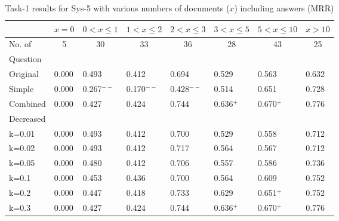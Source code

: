 \begin{table}[t]
  \begin{center}
    \caption{Task-1 results for Sys-5 with various numbers of documents ($x$) including answers (MRR)}
    \begin{tabular}{|l@{ }|l@{ }|l@{ }|l@{ }|l@{ }|l@{ }|l@{ }|l@{ }|} \hline
         &  \multicolumn{1}{c|}{$x=0$}        &  \multicolumn{1}{c|}{$0<x\leq1$}        & \multicolumn{1}{c|}{$1<x\leq2$}        & \multicolumn{1}{c|}{$2<x\leq3$}        & \multicolumn{1}{c|}{$3<x\leq5$}        & \multicolumn{1}{c|}{$5<x\leq10$}        & \multicolumn{1}{c|}{$x>10$}        \\\hline
No. of  & \multicolumn{1}{c|}{5}            & \multicolumn{1}{c|}{30}           & \multicolumn{1}{c|}{33}           & \multicolumn{1}{c|}{36}           & \multicolumn{1}{c|}{28}           & \multicolumn{1}{c|}{43}           & \multicolumn{1}{c|}{25}\\[-0.1cm]
Question  &  & & & & & & \\\hline
Original         & 0.000        & 0.493        & 0.412        & 0.694        & 0.529        & 0.563        & 0.632\\\hline
Simple           & 0.000        & 0.267$^{--}$ & 0.170$^{--}$ & 0.428$^{--}$ & 0.514        & 0.651        & 0.728\\\hline
Combined         & 0.000        & 0.427        & 0.424        & 0.744        & 0.636$^{+}$  & 0.670$^{+}$  & 0.776\\\hline
Decreased        &              &              &              &              &              &              &      \\
k=0.01           & 0.000        & 0.493        & 0.412        & 0.700        & 0.529        & 0.558        & 0.712\\
k=0.02           & 0.000        & 0.493        & 0.412        & 0.717        & 0.564        & 0.567        & 0.712\\
k=0.05           & 0.000        & 0.480        & 0.412        & 0.706        & 0.557        & 0.586        & 0.736\\
k=0.1            & 0.000        & 0.453        & 0.436        & 0.700        & 0.564        & 0.609        & 0.752\\
k=0.2            & 0.000        & 0.447        & 0.418        & 0.733        & 0.629        & 0.651$^{+}$  & 0.752\\
k=0.3            & 0.000        & 0.427        & 0.424        & 0.744        & 0.636$^{+}$  & 0.670$^{+}$  & 0.776\\

\end{tabular}
\end{center}
\end{table}
